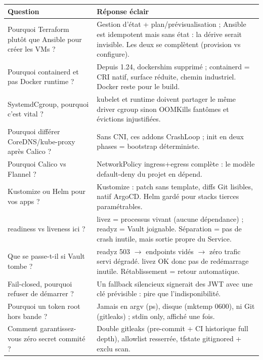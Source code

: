 \documentclass[12pt,a4paper,twoside,openright]{report}
\begin{document}
\begin{center}\label{tab:an-banque-de-questions-reponses-eclair}\end{center}
\begin{longtable}{@{}p{6.2cm}p{8.0cm}@{}}
\toprule
\textbf{Question} & \textbf{Réponse éclair} \\
\midrule
\endhead
Pourquoi Terraform plutôt que Ansible pour créer les VMs ? & Gestion d'état + plan/prévisualisation ; Ansible est idempotent mais sans état : la dérive serait invisible. Les deux se complètent (provision vs configure). \\
Pourquoi containerd et pas Docker runtime ? & Depuis 1.24, dockershim supprimé ; containerd = CRI natif, surface réduite, chemin industriel. Docker reste pour le build. \\
SystemdCgroup, pourquoi c'est vital ? & kubelet et runtime doivent partager le même driver cgroup sinon OOMKills fantômes et évictions injustifiées. \\
Pourquoi différer CoreDNS/kube-proxy après Calico ? & Sans CNI, ces addons CrashLoop ; init en deux phases = bootstrap déterministe. \\
Pourquoi Calico vs Flannel ? & NetworkPolicy ingress+egress complète : le modèle default-deny du projet en dépend. \\
Kustomize ou Helm pour vos apps ? & Kustomize : patch sans template, diffs Git lisibles, natif ArgoCD. Helm gardé pour stacks tierces paramétrables. \\
readiness vs liveness ici ? & livez = processus vivant (aucune dépendance) ; readyz = Vault joignable. Séparation = pas de crash inutile, mais sortie propre du Service. \\
Que se passe-t-il si Vault tombe ? & readyz 503 $\rightarrow$ endpoints vidés $\rightarrow$ zéro trafic servi dégradé. livez OK donc pas de redémarrage inutile. Rétablissement = retour automatique. \\
Fail-closed, pourquoi refuser de démarrer ? & Un fallback silencieux signerait des JWT avec une clé prévisible : pire que l'indisponibilité. \\
Pourquoi un token root hors bande ? & Jamais en argv (ps), disque (mktemp 0600), ni Git (gitleaks) ; stdin only, affiché une fois. \\
Comment garantissez-vous zéro secret commité ? & Double gitleaks (pre-commit + CI historique full depth), allowlist resserrée, tfstate gitignored + exclu scan. \\

\end{longtable}
\end{document}
